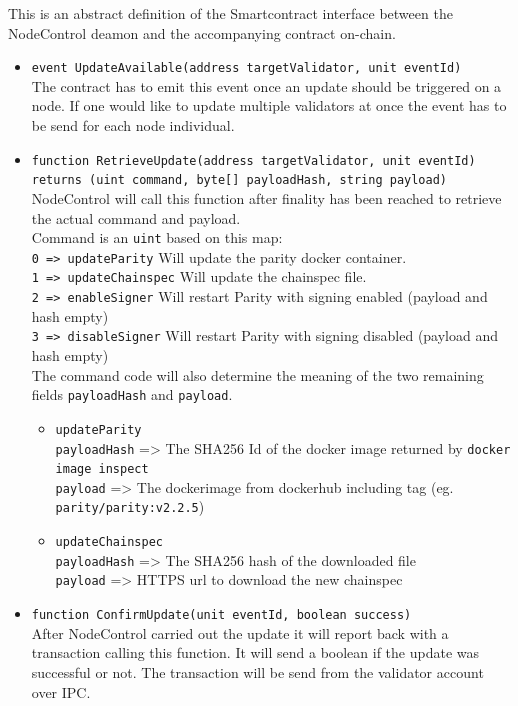 This is an abstract definition of the Smartcontract interface between the NodeControl deamon and the accompanying contract on-chain.

\begin{itemize}

    \item \texttt{event UpdateAvailable(address targetValidator, unit eventId)} \\
    The contract has to emit this event once an update should be triggered on a node. If one would like to update multiple validators at once the event has to be send for each node individual.

    \item \texttt{function RetrieveUpdate(address targetValidator, unit eventId)} \\ \texttt{returns (uint command, byte[] payloadHash, string payload)} \\  
    NodeControl will call this function after finality has been reached to retrieve the actual command and payload. \\
    Command is an \texttt{uint} based on this map: \\
    \texttt{0 => updateParity} Will update the parity docker container. \\
    \texttt{1 => updateChainspec} Will update the chainspec file. \\
    \texttt{2 => enableSigner} Will restart Parity with signing enabled (payload and hash empty) \\
    \texttt{3 => disableSigner} Will restart Parity with signing disabled (payload and hash empty) \\

    The command code will also determine the meaning of the two remaining fields \texttt{payloadHash} and \texttt{payload}.

    \begin{itemize}
        \item \texttt{updateParity} \\
        \texttt{payloadHash} => The SHA256 Id of the docker image returned by \texttt{docker image inspect} \\
        \texttt{payload} => The dockerimage from dockerhub including tag (eg. \texttt{parity/parity:v2.2.5})

        \item \texttt{updateChainspec} \\
        \texttt{payloadHash} => The SHA256 hash of the downloaded file \\
        \texttt{payload} => HTTPS url to download the new chainspec

    \end{itemize}
    
    \item \texttt{function ConfirmUpdate(unit eventId, boolean success)} \\
    After NodeControl carried out the update it will report back with a transaction calling this function. It will send a boolean if the update was successful or not. The transaction will be send from the validator account over IPC.

\end{itemize}
